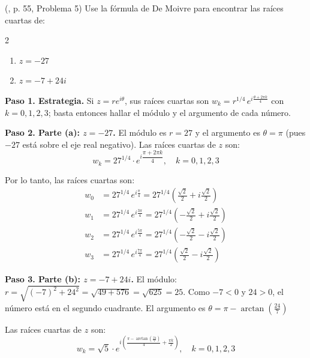 \begin{prob} (\cite{andreescu2014complex}, p. 55, Problema 5) Use la fórmula de De Moivre para encontrar las raíces cuartas de:
\begin{multicols}{2}
\begin{enumerate}[$a)$]
\item $z=-27$
\item $z=-7+24i$
\end{enumerate}
\end{multicols}
\begin{myproof}
\textbf{Paso 1. Estrategia.} Si $z=re^{i\theta}$, sus raíces cuartas son $w_k=r^{1/4}\,e^{i\frac{\theta+2\pi k}{4}}$ con $k=0,1,2,3$; basta entonces hallar el módulo y el argumento de cada número.

\textbf{Paso 2. Parte (a): $z = -27$.} El módulo es $r = 27$ y el argumento es $\theta = \pi$ (pues $-27$ está sobre el eje real negativo). Las raíces cuartas de $z$ son:
\[
w_k = 27^{1/4} \cdot e^{i\dfrac{\pi + 2\pi k}{4}}, \quad k = 0,1,2,3
\]

Por lo tanto, las raíces cuartas son:
\[
\boxed{
\begin{aligned}
w_0 &= 27^{1/4} \, e^{i\frac{\pi}{4}} = 27^{1/4} \left(\frac{\sqrt{2}}{2} + i\frac{\sqrt{2}}{2}\right) \\
w_1 &= 27^{1/4} \, e^{i\frac{3\pi}{4}} = 27^{1/4} \left(-\frac{\sqrt{2}}{2} + i\frac{\sqrt{2}}{2}\right) \\
w_2 &= 27^{1/4} \, e^{i\frac{5\pi}{4}} = 27^{1/4} \left(-\frac{\sqrt{2}}{2} - i\frac{\sqrt{2}}{2}\right) \\
w_3 &= 27^{1/4} \, e^{i\frac{7\pi}{4}} = 27^{1/4} \left(\frac{\sqrt{2}}{2} - i\frac{\sqrt{2}}{2}\right)
\end{aligned}
}
\]

\textbf{Paso 3. Parte (b): $z = -7 + 24i$.} El módulo: $r = \sqrt{(-7)^2 + 24^2} = \sqrt{49 + 576} = \sqrt{625} = 25.$  Como $-7 < 0$ y $24 > 0$, el número está en el segundo cuadrante. El argumento es \(
\theta = \pi - \arctan\left(\frac{24}{7}\right)
\)

Las raíces cuartas de $z$ son:
\[
\boxed{
w_k = \sqrt{5} \cdot e^{i\left(\frac{\pi - \arctan\left(\frac{24}{7}\right)}{4} + \frac{\pi k}{2}\right)}, \quad k = 0,1,2,3
}
\]

\end{myproof}

\end{prob}

